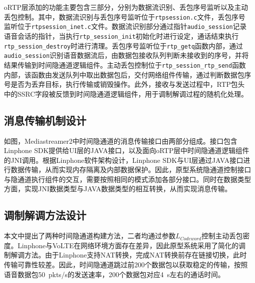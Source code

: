 oRTP层添加的功能主要包含三部分，分别为数据流识别、丢包序号监听以及主动丢包控制。其中，数据流识别与丢包序号监听位于\texttt{rtpsession.c}文件，丢包序号监听位于\texttt{rtpsession\_inet.c}文件。数据流识别部分通过指针\texttt{audio\_session}记录语音会话的指针，当执行\texttt{rtp\_session\_init}初始化时进行设定，通话结束执行\texttt{rtp\_session\_destroy}时进行清理。丢包序号监听位于\texttt{rtp\_getq}函数内部，通过\texttt{audio\_session}识别语音数据流后，由数据包接收队列判断未接收到的序号，并将结果传输到时间隐通道逻辑组件。主动丢包控制位于\texttt{rtp\_session\_rtp\_send}函数内部，该函数由发送队列中取出数据包后，交付网络组件传输，通过判断数据包序号是否为丢弃目标，执行传输或销毁操作。此外，接收与发送过程中，RTP包头中的SSRC字段被反馈到时间隐通道逻辑组件，用于调制解调过程的随机化处理。

\subsection{消息传输机制设计}
\label{chap:linphone:designation:data}


如图，Mediastreamer2中时间隐通道的消息传输接口由两部分组成。接口包含Linphone SDK提供给UI层的JAVA接口，以及面向oRTP层中时间隐通道逻辑组件的JNI调用。根据Linphone软件架构设计，Linphone SDK与UI层通过JAVA接口进行数据传输，从而实现内存隔离及内部数据保护。因此，原型系统隐通道控制接口与隐通道执行组件的交互，需要按照相同的模式添加各部分接口。同时在数据类型方面，实现JNI数据类型与JAVA数据类型的相互转换，从而实现消息传输。

\subsection{调制解调方法设计}
\label{chap:linphone:designation:modulation}

本文中提出了两种时间隐通道构建方法，二者均通过参数$L_{Codeword}$控制主动丢包密度。Linphone与VoLTE在网络环境方面存在差异，因此原型系统采用了简化的调制解调方法。由于Linphone支持NAT转换，完成NAT转换前存在链接切换，此时传输可靠性较差。因此，时间隐通道跳过前200个数据包以获取稳定的传输，按照语音数据包{50\ pkts/s}的发送速率，200个数据包对应{4\ s}左右的通话时间。

